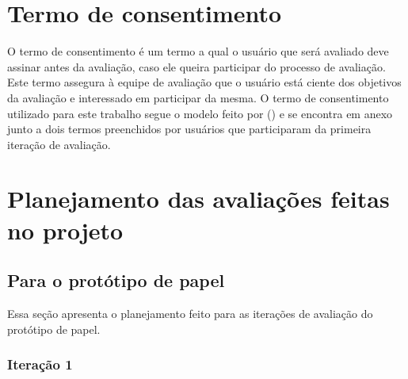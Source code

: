  \section{Termo de consentimento}
   
    O termo de consentimento é um termo a qual o usuário que será avaliado deve assinar antes da avaliação, 
    caso ele queira participar do processo de avaliação. Este termo assegura à equipe de avaliação que o usuário
    está ciente dos objetivos da avaliação e interessado em participar da mesma. O termo de consentimento utilizado
    para este trabalho segue o modelo feito por \citeauthor{termoconsentimento} (\citeyear{termoconsentimento}) e
    se encontra em anexo junto a dois termos preenchidos por usuários que participaram
    da primeira iteração de avaliação.
  
    \vfill
    \pagebreak
    \section{Planejamento das avaliações feitas no projeto}
      
      \subsection{Para o protótipo de papel}
      
	Essa seção apresenta o planejamento feito para as iterações de avaliação do protótipo de papel.
      
	\subsubsection{Iteração 1}
	  
